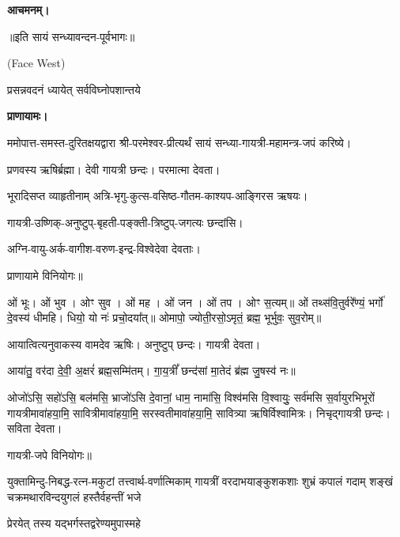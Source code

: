 \textbf{आचमनम्।}


\centerline{॥इति सायं सन्ध्यावन्दन-पूर्वभागः॥}



{\scriptsize (Face West)}

{प्रसन्नवदनं ध्यायेत् सर्वविघ्नोपशान्तये}

\textbf{प्राणायामः।}

ममोपात्त-समस्त-दुरितक्षयद्वारा श्री-परमेश्वर-प्रीत्यर्थं सायं सन्ध्या-गायत्री-महामन्त्र-जपं करिष्ये।


प्रणवस्य ऋषिर्ब्रह्मा।
देवी गायत्री छन्दः।
परमात्मा देवता।

भूरादिसप्त व्याहृतीनाम् अत्रि-भृगु-कुत्स-वसिष्ठ-गौतम-काश्यप-आङ्गिरस ऋषयः।

गायत्री-उष्णिक्-अनुष्टुप्-बृहती-पङ्क्ती-त्रिष्टुप्-जगत्यः छन्दांसि।

अग्नि-वायु-अर्क-वागीश-वरुण-इन्द्र-विश्वेदेवा देवताः।
      
प्राणायामे विनियोगः॥


ओं भूः। ओं भुव। ओꣳ सुव। ओं मह। ओं जन। ओं तप। ओꣳ स॒त्यम्॥
ओं तथ्स॑वि॒तुर्वरे᳚ण्यं॒ भर्गो॑ दे॒वस्य॑ धीमहि। धियो॒ यो नः॑ प्रचो॒दया᳚त्॥
ओमापो॒ ज्योती॒रसो॒ऽमृतं॒ ब्रह्म॒ भूर्भुवः॒ सुव॒रोम्॥




आयात्वित्यनुवाकस्य वामदेव ऋषिः।
अनुष्टुप् छन्दः।
गायत्री देवता।

आया॑तु॒ वर॑दा दे॒वी॒ अ॒क्षरं॑ ब्रह्म॒सम्मि॑तम्। गा॒य॒त्रीं᳚ छन्द॑सां मा॒तेदं ब्र॑ह्म जु॒षस्व॑ नः॥

ओजो॑ऽसि॒ सहो॑ऽसि॒ बल॑मसि॒ भ्राजो॑ऽसि दे॒वानां॒ धाम॒ नामा॑सि॒ विश्व॑मसि वि॒श्वायुः॒ सर्व॑मसि स॒र्वायुरभिभूरों गायत्रीमावा॑हया॒मि॒ सावित्रीमावा॑हया॒मि॒ सरस्वतीमावा॑ह\-या॒मि॒ सावित्र्या ऋषिर्विश्वामित्रः। निचृद्गायत्री छन्दः। सविता देवता।

गायत्री-जपे विनियोगः॥



{युक्तामिन्दु-निबद्ध-रत्न-मकुटां तत्त्वार्थ-वर्णात्मिकाम्}
{गायत्रीं वरदाभयाङ्कुशकशाः शुभ्रं कपालं गदाम्}
{शङ्खं चक्रमथारविन्दयुगलं हस्तैर्वहन्तीं भजे}

{प्रेरयेत् तस्य यद्भर्गस्तद्वरेण्यमुपास्महे}


